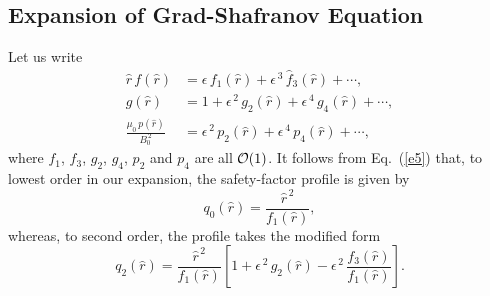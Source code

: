 \documentclass[12pt,prb,aps]{revtex4-1}
\begin{document}

\subsection{Expansion of Grad-Shafranov Equation}\label{exp}
Let us write
\begin{align}\label{e26v}
\hat{r}\,f(\hat{r}) &= \epsilon\,f_1(\hat{r}) +\epsilon^{\,3}\,\hat{f}_3(\hat{r})+\cdots,\\[0.5ex]
g(\hat{r}) &= 1+ \epsilon^{\,2}\,g_2(\hat{r}) + \epsilon^{\,4}\,g_4(\hat{r})+\cdots,\label{e27v}\\[0.5ex]
\frac{\mu_0\,p(\hat{r})}{B_0^{\,2}} &= \epsilon^{\,2}\,p_2(\hat{r}) + \epsilon^{\,4}\,p_4(\hat{r})+\cdots,
\end{align}
where $f_1$, $f_3$, $g_2$, $g_4$, $p_2$ and $p_4$ are all ${\cal O}(1)$. It follows from Eq.~(\ref{e5}) that, 
to lowest order in our expansion, the safety-factor profile is given by
\begin{equation}
q_0(\hat{r}) = \frac{\hat{r}^{\,2}}{f_1(\hat{r})},
\end{equation}
whereas, to second order,  the profile takes the modified form 
\begin{equation}\label{e26a}
q_2(\hat{r}) = \frac{\hat{r}^{\,2}}{f_1(\hat{r})}
\left[1+\epsilon^{\,2}\,g_2(\hat{r}) - \epsilon^{\,2}\,\frac{f_3(\hat{r})}{f_1(\hat{r})}\right].
\end{equation}
\end{document}
